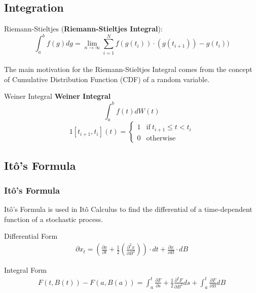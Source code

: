 \subsection{Integration}
\begin{frame}{Riemann-Stieltjes}
(\textbf{Riemann-Stieltjes Integral}): 
$$\displaystyle \int_{a}^{b} f(g)dg= \underset{n \to \infty}{\lim} \sum_{i=1}^{N} f(g(t_i)) \cdot (g(t_{i+1}))- g(t_i))$$\\

The main motivation for the Riemann-Stieltjes Integral comes from the concept of Cumulative Distribution Function (CDF) of a random variable. 
\end{frame}

\begin{frame}{Weiner Integral}
\textbf{Weiner Integral} $$\int_{a}^{b} f(t)dW(t)$$
$$1[t_{i+1}, t_i] (t)= \begin{cases} 1 & \text{if} \ t_{i+1} \leq t < t_i \\
0 & \text{otherwise} \end{cases}$$
\end{frame}


\subsection{It\^o's Formula}

\begin{frame}
\frametitle{It\^o's Formula}
It\^o's Formula is used in It\^o Calculus to find the differential of a time-dependent function of a stochastic process.
\vfill

		 \begin{block}{Differential Form}
      \begin{align*}
				\displaystyle \partial x_t =\left(\frac{\partial x}{\partial t} + \frac{1}{2} \left(\frac{\partial ^2 x}{\partial B ^2}\right)\right) \cdot  dt + \frac{\partial x}{\partial B} \cdot dB 
			\end{align*}
    \end{block}
		
\vfill

		\begin{block}{Integral Form}
      \begin{align*}
				\displaystyle F(t, B(t))-F(a,B(a))=
 \int_{a}^{t} \frac{\partial F}{\partial s} + \frac{1}{2} \frac{\partial^2 F}{\partial B^2}ds+
 \int_a^t \frac{\partial F}{\partial B} dB
			\end{align*}
    \end{block}

\vfill
\end{frame}

